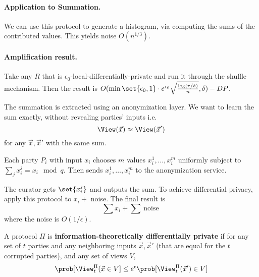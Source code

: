 
\paragraph{Application to Summation.}
We can use this protocol to generate a histogram,
via computing the sums of the contributed values.
This yields noise $O(n^{1/3})$.

\paragraph{Amplification result.}
Take any $R$ that is $\epsilon_0$-local-differentially-private and run it through the shuffle mechanism.
Then the result is $O(\min\set{\epsilon_0, 1} \cdot e^{\epsilon_0} \sqrt{\frac{\log(r/\delta)}{n}}, \delta) - DP$.


The summation is extracted using an anonymization layer.
We want to learn the sum exactly, without revealing parties' inputs i.e.
\[
    \View(\vec{x}) \approx \View(\vec{x}')
\]
for any $\vec{x}, \vec{x}'$ with the same sum.

\begin{prcl}
Each party $P_i$ with input $x_i$ chooses $m$ values $x_i^1, \dots, x_i^m$ uniformly subject to $\sum_j x_i^j = x_i \mod q$.
Then sends $x_i^1, \dots, x_i^m$ to the anonymization service.

The curator gets $\set{x_i^j}$ and outputs the sum.
To achieve differential privacy, apply this protocol to $x_i +$ noise.
The final result is 
\[
    \sum x_i + \sum~\text{noise}~ 
\]
where the noise is $O(1/\epsilon)$.
\end{prcl}

\begin{defn}
A protocol $\Pi$ is \textbf{information-theoretically differentially private} if for any set of $t$ parties and any neighboring inputs $\vec{x}, \vec{x}'$ (that are equal for the $t$ corrupted parties), and any set of views $V$,
\[
    \prob[\View_t^\Pi(\vec{x} \in V] \leq e^\epsilon \prob[\View_t^\Pi(\vec{x}') \in V]
\]
\end{defn}

